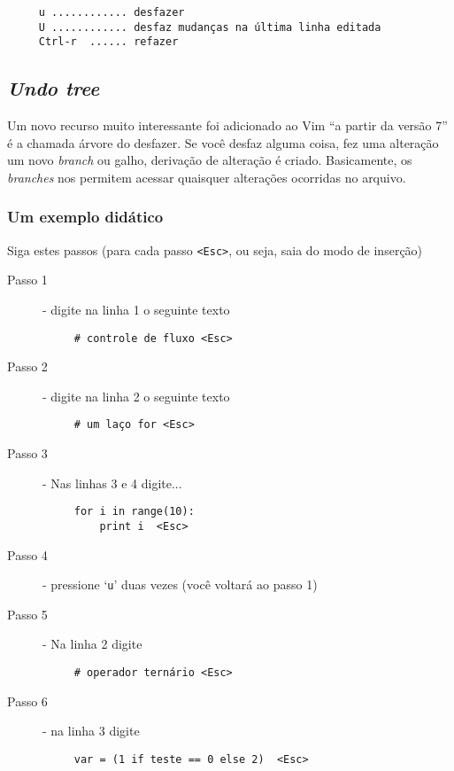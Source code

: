 \begin{verbatim}
     u ............ desfazer
     U ............ desfaz mudanças na última linha editada
     Ctrl-r  ...... refazer
\end{verbatim}

\subsection{{\em Undo tree}}
\label{Undo tree}

Um novo recurso muito interessante foi adicionado ao Vim ``a partir da
versão 7''  é a chamada árvore do desfazer.  Se
você desfaz alguma coisa, fez uma alteração um novo {\em branch} ou
galho, derivação de alteração é criado.  Basicamente, os {\em branches}
nos permitem acessar quaisquer alterações ocorridas no arquivo.

\subsubsection{Um exemplo didático}
\label{Um exemplo didático}

Siga estes passos (para cada passo \verb|<Esc>|, ou seja, saia do modo
de inserção)


\begin{description}
\item [Passo 1] - digite na linha 1 o seguinte texto
\begin{verbatim}
     # controle de fluxo <Esc>
\end{verbatim}

\item [Passo 2] - digite na linha 2 o seguinte texto
\begin{verbatim}
     # um laço for <Esc>
\end{verbatim}

\item [Passo 3] - Nas linhas 3 e 4 digite...

\begin{verbatim}
     for i in range(10):
         print i  <Esc>
\end{verbatim}

\item [Passo 4] - pressione `{\tt u}' duas vezes (você voltará ao passo 1)
\item [Passo 5] - Na linha 2 digite

\begin{verbatim}
     # operador ternário <Esc>
\end{verbatim}

\item [Passo 6] - na linha 3 digite

\begin{verbatim}
     var = (1 if teste == 0 else 2)  <Esc>
\end{verbatim}

\end{description}

